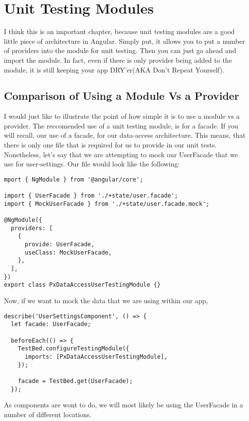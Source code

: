 
\chapter{ Unit Testing Modules }
I think this is an important chapter, because unit testing modules are a good
little piece of architecture in Angular. Simply put, it allows you to put a
number of providers into the module for unit testing. Then you can just go
ahead and import the module. In fact, even if there is only provider being
added to the module, it is still keeping your app DRY'er(AKA Don't Repeat
Yourself).

\section{Comparison of Using a Module Vs a Provider}
I would just like to illustrate the point of how simple it is to use a module
vs a provider. The reccomended use of a unit testing module, is for a facade.
If you will recall, our use of a facade, for our data-access architecture. This
means, that there is only one file that is required for us to provide in our
unit tests. Nonetheless, let's say that we are attempting to mock our UserFacade
that we use for user-settings. Our file would look like the following:

\begin{lstlisting}
mport { NgModule } from '@angular/core';

import { UserFacade } from './+state/user.facade';
import { MockUserFacade } from './+state/user.facade.mock';

@NgModule({
  providers: [
    {
      provide: UserFacade,
      useClass: MockUserFacade,
    },
  ],
})
export class PxDataAccessUserTestingModule {}
\end{lstlisting}

Now, if we want to mock the data that we are using within our app,

\begin{lstlisting}
describe('UserSettingsComponent', () => {
  let facade: UserFacade;

  beforeEach(() => {
    TestBed.configureTestingModule({
      imports: [PxDataAccessUserTestingModule],
    });

    facade = TestBed.get(UserFacade);
  });
\end{lstlisting}

As components are wont to do, we will most likely be using the UserFacade in a
number of different locations.

